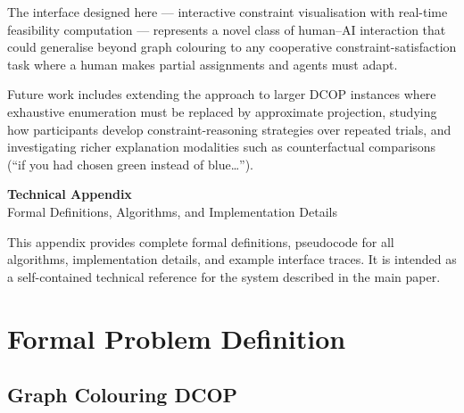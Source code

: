 \documentclass[10pt]{article}
\theoremstyle{definition}
\begin{document}
The interface designed here --- interactive constraint visualisation with real-time feasibility
computation --- represents a novel class of human--AI interaction that could generalise beyond
graph colouring to any cooperative constraint-satisfaction task where a human makes partial
assignments and agents must adapt.

Future work includes extending the approach to larger DCOP instances where exhaustive enumeration
must be replaced by approximate projection, studying how participants develop constraint-reasoning
strategies over repeated trials, and investigating richer explanation modalities such as
counterfactual comparisons (``if you had chosen green instead of blue\ldots'').





\clearpage
\appendix
\renewcommand{\thesection}{\Alph{section}}

\begin{center}
  {\LARGE\bfseries Technical Appendix}\\[0.5em]
  {\large Formal Definitions, Algorithms, and Implementation Details}
\end{center}
\vspace{1em}

\noindent This appendix provides complete formal definitions, pseudocode for all algorithms,
implementation details, and example interface traces.  It is intended as a self-contained
technical reference for the system described in the main paper.

\tableofcontents
\newpage

\section{Formal Problem Definition}
\label{app:problem}

\subsection{Graph Colouring DCOP}
\end{document}
